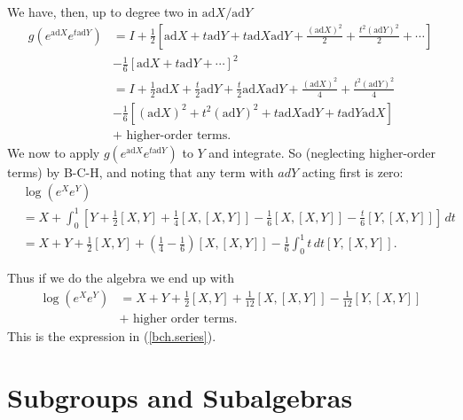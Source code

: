 \documentclass[12pt]{amsbook}
\theoremstyle{plain}
\numberwithin{equation}{chapter}
\numberwithin{theorem}{chapter}
\begin{document}
We have, then, up to degree two in $\mathrm{ad}X/\mathrm{ad}Y$%
\begin{align*}
g\left(  e^{\mathrm{ad}X}e^{t\mathrm{ad}Y}\right)   & =I+\frac{1}{2}\left[
\mathrm{ad}X+t\mathrm{ad}Y+t\mathrm{ad}X\mathrm{ad}Y+\frac{\left(
\mathrm{ad}X\right)  ^{2}}{2}+\frac{t^{2}\left(  \mathrm{ad}Y\right)  ^{2}}%
{2}+\cdots\right] \\
& -\frac{1}{6}\left[  \mathrm{ad}X+t\mathrm{ad}Y+\cdots\right]  ^{2}\\
& =I+\frac{1}{2}\mathrm{ad}X+\frac{t}{2}\mathrm{ad}Y+\frac{t}{2}%
\mathrm{ad}X\mathrm{ad}Y+\frac{\left(  \mathrm{ad}X\right)  ^{2}}{4}%
+\frac{t^{2}\left(  \mathrm{ad}Y\right)  ^{2}}{4}\\
& -\frac{1}{6}\left[  \left(  \mathrm{ad}X\right)  ^{2}+t^{2}\left(
\mathrm{ad}Y\right)  ^{2}+t\mathrm{ad}X\mathrm{ad}Y+t\mathrm{ad}%
Y\mathrm{ad}X\right] \\
& +\text{ higher-order terms.}%
\end{align*}
We now to apply $g\left(  e^{\mathrm{ad}X}e^{t\mathrm{ad}Y}\right)  $ to $Y$
and integrate. So (neglecting higher-order terms) by B-C-H, and noting that
any term with $adY$ acting first is zero:
\begin{align*}
& \log\left(  e^{X}e^{Y}\right) \\
& =X+\int_{0}^{1}\left[  Y+\frac{1}{2}\left[  X,Y\right]  +\frac{1}{4}\left[
X,\left[  X,Y\right]  \right]  -\frac{1}{6}\left[  X,\left[  X,Y\right]
\right]  -\frac{t}{6}\left[  Y,\left[  X,Y\right]  \right]  \right]  \,dt\\
& =X+Y+\frac{1}{2}\left[  X,Y\right]  +\left(  \frac{1}{4}-\frac{1}{6}\right)
\left[  X,\left[  X,Y\right]  \right]  -\frac{1}{6}\int_{0}^{1}t\,dt\left[
Y,\left[  X,Y\right]  \right]  \text{.}%
\end{align*}

Thus if we do the algebra we end up with
\begin{align*}
\log\left(  e^{X}e^{Y}\right)   & =X+Y+\frac12\left[  X,Y\right]  +\frac
1{12}\left[  X,\left[  X,Y\right]  \right]  -\frac1{12}\left[  Y,\left[
X,Y\right]  \right] \\
& +\text{ higher order terms.}%
\end{align*}
This is the expression in (\ref{bch.series}).

\section{Subgroups and Subalgebras}
\end{document}
